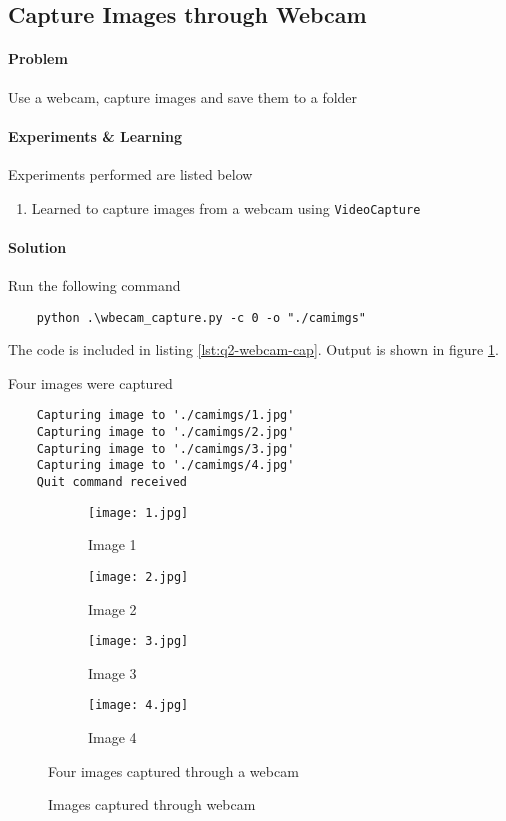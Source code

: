 \subsection{Capture Images through Webcam}

\paragraph{Problem}
Use a webcam, capture images and save them to a folder

\paragraph{Experiments \& Learning} Experiments performed are listed below

\begin{enumerate}
    \item Learned to capture images from a webcam using \texttt{VideoCapture}
\end{enumerate}

\paragraph{Solution}
Run the following command

\begin{verbatim}
    python .\wbecam_capture.py -c 0 -o "./camimgs"
\end{verbatim}

The code is included in listing \ref{lst:q2-webcam-cap}. Output is shown in figure \ref{fig:q2-webcam-imgs}.



Four images were captured 

\begin{verbatim}
    Capturing image to './camimgs/1.jpg'
    Capturing image to './camimgs/2.jpg'
    Capturing image to './camimgs/3.jpg'
    Capturing image to './camimgs/4.jpg'
    Quit command received
\end{verbatim}

\begin{figure}[t]
    \centering
    \begin{subfigure}[b]{0.45\textwidth}
        \texttt{[image: 1.jpg]}
        \caption{Image 1}
    \end{subfigure}
    \begin{subfigure}[b]{0.45\textwidth}
        \texttt{[image: 2.jpg]}
        \caption{Image 2}
    \end{subfigure}
    \begin{subfigure}[b]{0.45\textwidth}
        \texttt{[image: 3.jpg]}
        \caption{Image 3}
    \end{subfigure}
    \begin{subfigure}[b]{0.45\textwidth}
        \texttt{[image: 4.jpg]}
        \caption{Image 4}
    \end{subfigure}
    \caption{Images captured through webcam}
    \label{fig:q2-webcam-imgs}
    \small
        Four images captured through a webcam
\end{figure}
